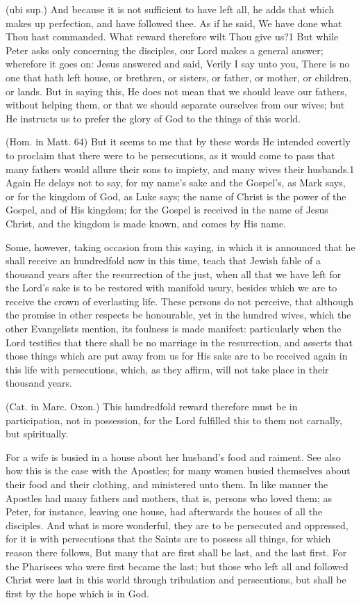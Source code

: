 (ubi sup.) And because it is not sufficient to have left all, he adds that which makes up perfection, and have followed thee. As if he said, We have done what Thou hast commanded. What reward therefore wilt Thou give us?1 But while Peter asks only concerning the disciples, our Lord makes a general answer; wherefore it goes on: Jesus answered and said, Verily I say unto you, There is no one that hath left house, or brethren, or sisters, or father, or mother, or children, or lands. But in saying this, He does not mean that we should leave our fathers, without helping them, or that we should separate ourselves from our wives; but He instructs us to prefer the glory of God to the things of this world.

 (Hom. in Matt. 64) But it seems to me that by these words He intended covertly to proclaim that there were to be persecutions, as it would come to pass that many fathers would allure their sons to impiety, and many wives their husbands.1 Again He delays not to say, for my name’s sake and the Gospel’s, as Mark says, or for the kingdom of God, as Luke says; the name of Christ is the power of the Gospel, and of His kingdom; for the Gospel is received in the name of Jesus Christ, and the kingdom is made known, and comes by His name.

 Some, however, taking occasion from this saying, in which it is announced that he shall receive an hundredfold now in this time, teach that Jewish fable of a thousand years after the resurrection of the just, when all that we have left for the Lord’s sake is to be restored with manifold usury, besides which we are to receive the crown of everlasting life. These persons do not perceive, that although the promise in other respects be honourable, yet in the hundred wives, which the other Evangelists mention, its foulness is made manifest: particularly when the Lord testifies that there shall be no marriage in the resurrection, and asserts that those things which are put away from us for His sake are to be received again in this life with persecutions, which, as they affirm, will not take place in their thousand years.

 (Cat. in Marc. Oxon.) This hundredfold reward therefore must be in participation, not in possession, for the Lord fulfilled this to them not carnally, but spiritually.

 For a wife is busied in a house about her husband’s food and raiment. See also how this is the case with the Apostles; for many women busied themselves about their food and their clothing, and ministered unto them. In like manner the Apostles had many fathers and mothers, that is, persons who loved them; as Peter, for instance, leaving one house, had afterwards the houses of all the disciples. And what is more wonderful, they are to be persecuted and oppressed, for it is with persecutions that the Saints are to possess all things, for which reason there follows, But many that are first shall be last, and the last first. For the Pharisees who were first became the last; but those who left all and followed Christ were last in this world through tribulation and persecutions, but shall be first by the hope which is in God.

